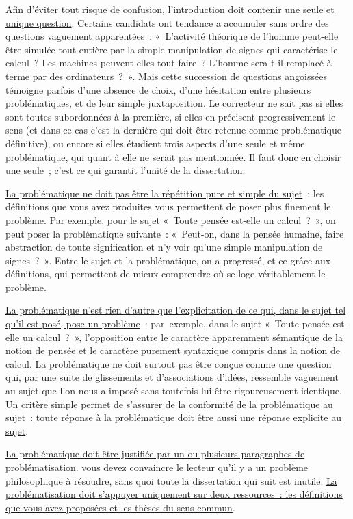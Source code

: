 \documentclass[a4paper,12pt]{article}
\begin{document}
Afin d'éviter tout risque de confusion, \uline{l'introduction doit contenir
une seule et unique question}. Certains candidats ont tendance a
accumuler sans ordre des questions vaguement apparentées : « L'activité
théorique de l'homme peut-elle être simulée tout entière par la simple
manipulation de signes qui caractérise le calcul ? Les machines
peuvent-elles tout faire ? L'homme sera-t-il remplacé à terme par des
ordinateurs ? ». Mais cette succession de questions angoissées témoigne
parfois d'une absence de choix, d'une hésitation entre plusieurs
problématiques, et de leur simple juxtaposition. Le correcteur ne sait
pas si elles sont toutes subordonnées à la première, si elles en
précisent progressivement le sens (et dans ce cas c'est la dernière qui
doit être retenue comme problématique définitive), ou encore si elles
étudient trois aspects d'une seule et même problématique, qui quant à
elle ne serait pas mentionnée. Il faut donc en choisir une seule ; c'est
ce qui garantit l'unité de la dissertation.

\uline{La problématique ne doit pas être la répétition pure et simple du
sujet} : les définitions que vous avez produites vous permettent de
poser plus finement le problème. Par exemple, pour le sujet « Toute
pensée est-elle un calcul ? », on peut poser la problématique suivante :
« Peut-on, dans la pensée humaine, faire abstraction de toute
signification et n'y voir qu'une simple manipulation de signes ? ».
Entre le sujet et la problématique, on a progressé, et ce grâce aux
définitions, qui permettent de mieux comprendre où se loge véritablement
le problème.

\uline{La problématique n'est rien d'autre que l'explicitation de ce qui, dans
le sujet tel qu'il est posé, pose un problème} : par exemple, dans le
sujet « Toute pensée est-elle un calcul ? », l'opposition entre le
caractère apparemment sémantique de la notion de pensée et le caractère
purement syntaxique compris dans la notion de calcul. La problématique
ne doit surtout pas être conçue comme une question qui, par une suite de
glissements et d'associations d'idées, ressemble vaguement au sujet que
l'on nous a imposé sans toutefois lui être rigoureusement identique. Un
critère simple permet de s'assurer de la conformité de la problématique
au sujet : \uline{toute réponse à la problématique doit être aussi une réponse
explicite au sujet}.

\uline{La problématique doit être justifiée par un ou plusieurs paragraphes de
problématisation}. vous devez convaincre le lecteur qu'il y a un
problème philosophique à résoudre, sans quoi toute la dissertation qui
suit est inutile. \uline{La problématisation doit s'appuyer uniquement sur
deux ressources : les définitions que vous avez proposées et les thèses
du sens commun}.
\end{document}
